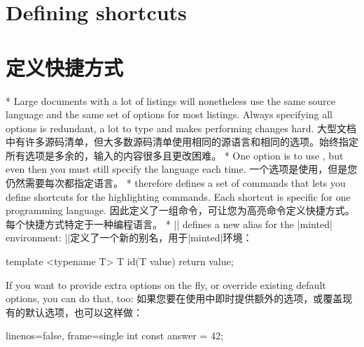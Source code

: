 
\begin{paracol}{2}
\section{Defining shortcuts}
\switchcolumn
\section{定义快捷方式}
\switchcolumn[0]*%
Large documents with a lot of listings will nonetheless use the same source language and the
same set of options for most listings.
Always specifying all options is redundant, a lot to type and makes performing changes hard.
\switchcolumn
大型文档中有许多源码清单，但大多数源码清单使用相同的源语言和相同的选项。始终指定所有选项是多余的，输入的内容很多且更改困难。
\switchcolumn[0]*%
One option is to use \cmd\setminted, but even then you must still specify the language each time.
\switchcolumn
一个选项是使用\cmd\setminted，但是您仍然需要每次都指定语言。
\switchcolumn[0]*%
 therefore defines a set of commands that lets you define shortcuts for the highlighting commands.
Each shortcut is specific for one programming language.
\switchcolumn
{}因此定义了一组命令，可让您为高亮命令定义快捷方式。每个快捷方式特定于一种编程语言。
\switchcolumn[0]*%
\DescribeMacro{\newminted}
|\newminted| defines a new alias for the |minted| environment:
\switchcolumn
\DescribeMacro{\newminted}
|\newminted|定义了一个新的别名，用于|minted|环境：
\end{paracol}


\begin{example}

    \begin{cppcode}
        template <typename T>
        T id(T value) {
            return value;
        }
    \end{cppcode}
\end{example}

\begin{paracol}{2}
If you want to provide extra options on the fly, or override existing default options, you can do that, too:
\switchcolumn
如果您要在使用中即时提供额外的选项，或覆盖现有的默认选项，也可以这样做：
\end{paracol}


\begin{example}

    \begin{cppcode*}{linenos=false,
                    frame=single}
        int const answer = 42;
    \end{cppcode*}
\end{example}


